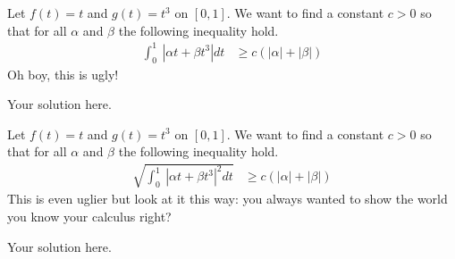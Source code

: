 \documentclass[11pt]{SelfArxOneColBMN}
\begin{document}
\begin{exercise}
Let $f(t) = t$ and $g(t) = t^3$ on $[0,1]$.
We want to find a constant $c>0$ so that for all $\alpha$ and
$\beta$ the following inequality hold.
\begin{eqnarray*}
\int_0^1 \: | \alpha t + \beta t^3| dt &\geq c( |\alpha| + |\beta|)
\end{eqnarray*}
\noindent
Oh boy, this is ugly!
\end{exercise}

\begin{solution}
Your solution here.
\end{solution}
	
\begin{exercise}
Let $f(t) = t$ and $g(t) = t^3$ on $[0,1]$.
We want to find a constant $c>0$ so that for all $\alpha$ and
$\beta$ the following inequality hold.
\begin{eqnarray*}
\sqrt{\int_0^1 \: | \alpha t + \beta t^3|^2 dt} &\geq c( |\alpha| + |\beta|)
\end{eqnarray*}
\noindent
This is even uglier but look at it this way: you always wanted to
show the world you know your calculus right?
\end{exercise}

\begin{solution}
Your solution here.
\end{solution}
\end{document}
